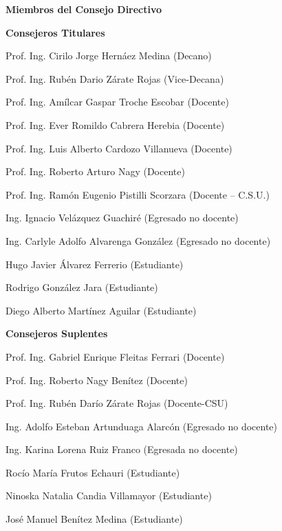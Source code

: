 \begin{center}
\textbf{Miembros del Consejo Directivo}
\end{center}
	\vspace{-5mm}
	
\begin{center}
\textbf{Consejeros Titulares}
\end{center}

Prof. Ing. Cirilo Jorge Hernáez Medina (Decano)

Prof. Ing. Rubén Dario Zárate Rojas (Vice-Decana)

Prof. Ing. Amílcar Gaspar Troche Escobar (Docente)

Prof. Ing. Ever Romildo Cabrera Herebia (Docente)

Prof. Ing. Luis Alberto Cardozo Villanueva (Docente)

Prof. Ing. Roberto Arturo Nagy  (Docente)

Prof. Ing. Ramón Eugenio Pistilli Scorzara (Docente – C.S.U.)

Ing. Ignacio Velázquez Guachiré (Egresado no docente)

Ing. Carlyle Adolfo Alvarenga González (Egresado no docente)

Hugo Javier Álvarez  Ferrerio (Estudiante)

Rodrigo González Jara (Estudiante)

Diego Alberto Martínez Aguilar (Estudiante) 
	
	\vspace{5mm}
	
 
 \begin{center}
	\textbf{Consejeros Suplentes }
 \end{center}
	
Prof. Ing. Gabriel Enrique Fleitas Ferrari (Docente)

Prof. Ing. Roberto Nagy Benítez (Docente)

Prof. Ing. Rubén Darío Zárate Rojas (Docente-CSU)

Ing. Adolfo  Esteban Artunduaga Alarcón (Egresado no docente)

Ing. Karina Lorena Ruiz Franco (Egresada no docente)

Rocío María Frutos Echauri (Estudiante)

Ninoska Natalia Candia Villamayor (Estudiante)

José Manuel Benítez Medina (Estudiante)
	